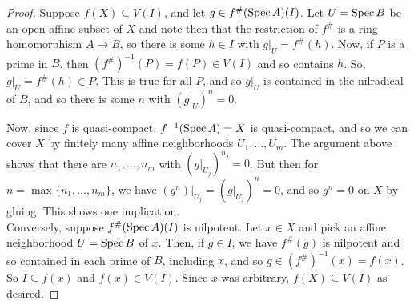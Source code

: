 \begin{proof}
	Suppose $f(X) \subseteq V(I)$, and let $g \in f^\#(\operatorname{Spec} A)(I)$. Let $U = \operatorname{Spec} B$ be an open affine subset of $X$ and note then that the restriction of $f^\#$ is a ring homomorphism $A \to B$, so there is some $h \in I$ with $g|_U = f^\#(h)$. Now, if $P$ is a prime in $B$, then $(f^\#)^{-1}(P) = f(P) \in V(I)$ and so contains $h$. So, $g|_U = f^\#(h) \in P$. This is true for all $P$, and so $g|_U$ is contained in the nilradical of $B$, and so there is some $n$ with $(g|_U)^n = 0$.
	
	Now, since $f$ is quasi-compact, $f^{-1}(\operatorname{Spec} A) = X$ is quasi-compact, and so we can cover $X$ by finitely many affine neighborhoods $U_1,\ldots,U_m$. The argument above shows that there are $n_1,\ldots,n_m$ with $(g|_{U_j})^{n_j} = 0$. But then for $n = \max\{n_1,\ldots,n_m\}$, we have $(g^n)|_{U_j} = (g|_{U_j})^n = 0$, and so $g^n = 0$ on $X$ by gluing. This shows one implication. \\
	
	Conversely, suppose $f^\#(\operatorname{Spec} A)(I)$ is nilpotent. Let $x \in X$ and pick an affine neighborhood $U = \operatorname{Spec} B$ of $x$. Then, if $g \in I$, we have $f^\#(g)$ is nilpotent and so contained in each prime of $B$, including $x$, and so $g \in (f^\#)^{-1}(x) = f(x)$. So $I \subseteq f(x)$ and $f(x) \in V(I)$. Since $x$ was arbitrary, $f(X) \subseteq V(I)$ as desired.
\end{proof}
